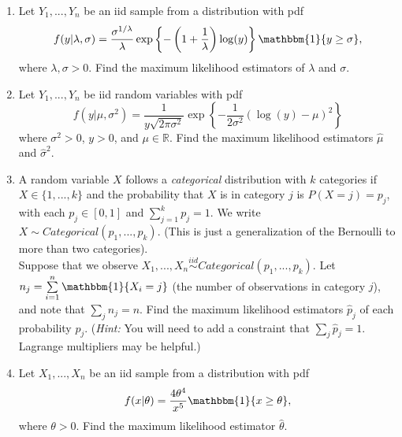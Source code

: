 \documentclass[11pt]{article}
\begin{document}
\begin{enumerate}
\item Let $Y_1,...,Y_n$ be an iid sample from a distribution with pdf 
$$f(y | \lambda, \sigma) = \dfrac{\sigma^{1/\lambda}}{\lambda} \exp \left\lbrace -\left(1 + \frac{1}{\lambda}\right) \log(y) \right\rbrace \mathbbm{1}\{ y \geq \sigma \},$$
where $\lambda, \sigma > 0$. Find the maximum likelihood estimators of $\lambda$ and $\sigma$.\\

\hspace{1cm}

\item Let $Y_1,...,Y_n$ be iid random variables with pdf
$$f(y|\mu, \sigma^2) = \frac{1}{y \sqrt{2 \pi \sigma^2}} \exp \left\lbrace -\frac{1}{2\sigma^2}(\log(y) - \mu)^2 \right\rbrace$$
where $\sigma^2 > 0$, $y > 0$, and $\mu \in \mathbb{R}$. Find the maximum likelihood estimators $\widehat{\mu}$ and $\widehat{\sigma}^2$.\\

\hspace{1cm}

\item A random variable $X$ follows a \textit{categorical} distribution with $k$ categories if $X \in \{1,...,k\}$ and the probability that $X$ is in category $j$ is $P(X = j) = p_j$, with each $p_j \in [0,1]$ and $\sum \limits_{j=1}^k p_j = 1$. We write $X \sim Categorical(p_1,...,p_k)$. (This is just a generalization of the Bernoulli to more than two categories).\\

\noindent Suppose that we observe $X_1,...,X_n \overset{iid}{\sim} Categorical(p_1,...,p_k)$. Let $n_j = \sum \limits_{i=1}^n  \mathbbm{1}\{X_i = j\}$ (the number of observations in category $j$), and note that $\sum_j n_j = n$. Find the maximum likelihood estimators $\widehat{p}_j$ of each probability $p_j$. (\textit{Hint:} You will need to add a constraint that $\sum_j \widehat{p}_j = 1$. Lagrange multipliers may be helpful.)\\

\hspace{1cm}

\item Let $X_1,...,X_n$ be an iid sample from a distribution with pdf
$$f(x|\theta) = \frac{4 \theta^4}{x^5} \mathbbm{1}\{x \geq \theta\},$$
where $\theta > 0$. Find the maximum likelihood estimator $\widehat{\theta}$.

\end{enumerate}
\end{document}
